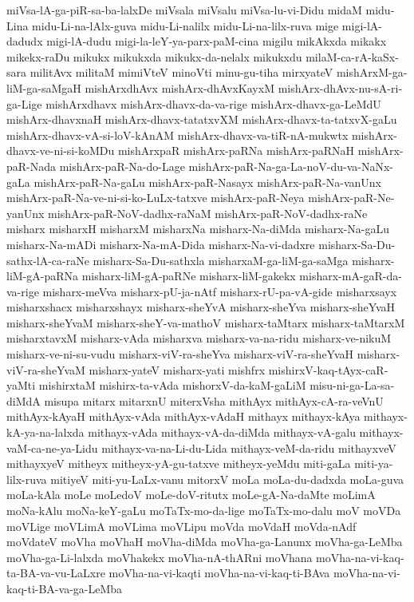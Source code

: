 {miVsa-lA-ga-piR-sa-ba-lalxDe
miVsala
miVsalu
miVsa-lu-vi-Didu
midaM
midu-Lina
midu-Li-na-lAlx-guva
midu-Li-nalilx
midu-Li-na-lilx-ruva
mige
migi-lA-dadudx
migi-lA-dudu
migi-la-leY-ya-parx-paM-cina
migilu
mikAkxda
mikakx
mikekx-raDu
mikukx
mikukxda
mikukx-da-nelalx
mikukxdu
milaM-ca-rA-kaSx-sara
militAvx
militaM
mimiVteV
minoVti
minu-gu-tiha
mirxyateV
mishArxM-ga-liM-ga-saMgaH
mishArxdhAvx
mishArx-dhAvxKayxM
mishArx-dhAvx-nu-sA-ri-ga-Lige
mishArxdhavx
mishArx-dhavx-da-va-rige
mishArx-dhavx-ga-LeMdU
mishArx-dhavxnaH
mishArx-dhavx-tatatxvXM
mishArx-dhavx-ta-tatxvX-gaLu
mishArx-dhavx-vA-si-loV-kAnAM
mishArx-dhavx-va-tiR-nA-mukwtx
mishArx-dhavx-ve-ni-si-koMDu
mishArxpaR
mishArx-paRNa
mishArx-paRNaH
mishArx-paR-Nada
mishArx-paR-Na-do-Lage
mishArx-paR-Na-ga-La-noV-du-va-NaNx-gaLa
mishArx-paR-Na-gaLu
mishArx-paR-Nasayx
mishArx-paR-Na-vanUnx
mishArx-paR-Na-ve-ni-si-ko-LuLx-tatxve
mishArx-paR-Neya
mishArx-paR-Ne-yanUnx
mishArx-paR-NoV-dadhx-raNaM
mishArx-paR-NoV-dadhx-raNe
misharx
misharxH
misharxM
misharxNa
misharx-Na-diMda
misharx-Na-gaLu
misharx-Na-mADi
misharx-Na-mA-Dida
misharx-Na-vi-dadxre
misharx-Sa-Du-sathx-lA-ca-raNe
misharx-Sa-Du-sathxla
misharxaM-ga-liM-ga-saMga
misharx-liM-gA-paRNa
misharx-liM-gA-paRNe
misharx-liM-gakekx
misharx-mA-gaR-da-va-rige
misharx-meVva
misharx-pU-ja-nAtf
misharx-rU-pa-vA-gide
misharxsayx
misharxshacx
misharxshayx
misharx-sheYvA
misharx-sheYva
misharx-sheYvaH
misharx-sheYvaM
misharx-sheY-va-mathoV
misharx-taMtarx
misharx-taMtarxM
misharxtavxM
misharx-vAda
misharxva
misharx-va-na-ridu
misharx-ve-nikuM
misharx-ve-ni-su-vudu
misharx-viV-ra-sheYva
misharx-viV-ra-sheYvaH
misharx-viV-ra-sheYvaM
misharx-yateV
misharx-yati
mishfrx
mishirxV-kaq-tAyx-caR-yaMti
mishirxtaM
mishirx-ta-vAda
mishorxV-da-kaM-gaLiM
misu-ni-ga-La-sa-diMdA
misupa
mitarx
mitarxnU
miterxVsha
mithAyx
mithAyx-cA-ra-veVnU
mithAyx-kAyaH
mithAyx-vAda
mithAyx-vAdaH
mithayx
mithayx-kAya
mithayx-kA-ya-na-lalxda
mithayx-vAda
mithayx-vA-da-diMda
mithayx-vA-galu
mithayx-vaM-ca-ne-ya-Lidu
mithayx-va-na-Li-du-Lida
mithayx-veM-da-ridu
mithayxveV
mithayxyeV
mitheyx
mitheyx-yA-gu-tatxve
mitheyx-yeMdu
miti-gaLa
miti-ya-lilx-ruva
mitiyeV
miti-yu-LaLx-vanu
mitorxV
moLa
moLa-du-dadxda
moLa-guva
moLa-kAla
moLe
moLedoV
moLe-doV-ritutx
moLe-gA-Na-daMte
moLimA
moNa-kAlu
moNa-keY-gaLu
moTaTx-mo-da-lige
moTaTx-mo-dalu
moV
moVDa
moVLige
moVLimA
moVLima
moVLipu
moVda
moVdaH
moVda-nAdf
moVdateV
moVha
moVhaH
moVha-diMda
moVha-ga-Lanunx
moVha-ga-LeMba
moVha-ga-Li-lalxda
moVhakekx
moVha-nA-thARni
moVhana
moVha-na-vi-kaq-ta-BA-va-vu-LaLxre
moVha-na-vi-kaqti
moVha-na-vi-kaq-ti-BAva
moVha-na-vi-kaq-ti-BA-va-ga-LeMba
}
